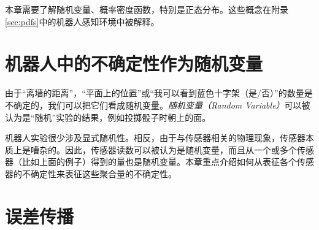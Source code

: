 
本章需要了解随机变量、概率密度函数，特别是正态分布。这些概念在附录\ref{sec:pdfs}中的机器人感知环境中被解释。


\section{机器人中的不确定性作为随机变量}
由于“离墙的距离”，“平面上的位置”或“我可以看到蓝色十字架（是/否）”的数量是不确定的，我们可以把它们看成随机变量。\emph{随机变量（Random Variable）}可以被认为是“随机”实验的结果，例如投掷骰子时朝上的面。


机器人实验很少涉及显式随机性。相反，由于与传感器相关的物理现象，传感器本质上是嘈杂的。因此，传感器读数可以被认为是随机变量，而且从一个或多个传感器（比如上面的例子）得到的量也是随机变量。本章重点介绍如何从表征各个传感器的不确定性来表征这些聚合量的不确定性。

\section{误差传播}
\label{sec:errorprop}

